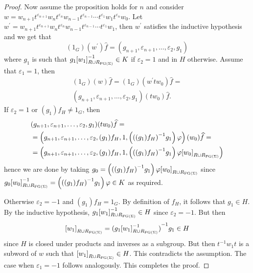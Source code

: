 \begin{proof}
  Now assume the proposition holds for $n$ and consider
  $w = w_{n+1} t^{\varepsilon_{n+1}} w_n t^{\varepsilon_n} w_{n-1} t^{\varepsilon_{n-1}} \cdots
  t^{\varepsilon_{1}}w_{1} t^{\varepsilon_n}w_0$.
  Let $w^\prime = w_{n+1} t^{\varepsilon_{n+1}} w_n t^{\varepsilon_n} w_{n-1}
  t^{\varepsilon_{n-1}} \cdots t^{\varepsilon_{1}}w_{1}$, then $w^\prime$ satisfies the inductive
  hypothesis and we get that
  \[(1_G)(w^\prime)\widehat{f} = (g_{n+1}, \varepsilon_{n+1}, \ldots, \varepsilon_2, g_1)\]
  where $g_1$ is such that $g_1 {[w_1]}_{R\cup R_{\textrm{FG}(\Sigma)}}^{-1}\in K$ if $\varepsilon_2 = 1$ and in $H$ otherwise.
  Assume that $\varepsilon_1 = 1$, then
  \begin{align*}
    (1_G)(w)\widehat{f} = (1_G)(w^\prime t w_0)\widehat{f} = \\
    (g_{n+1}, \varepsilon_{n+1}, \ldots, \varepsilon_2, g_1)(tw_0)\widehat{f}.
  \end{align*}
  If $\varepsilon_2 = 1$ or $(g_1)f_H \neq 1_G$, then
  \begin{align*}
    &(g_{n+1}, \varepsilon_{n+1}, \ldots, \varepsilon_2, g_1)(tw_0)\widehat{f} = \\
    &=\left(g_{n+1}, \varepsilon_{n+1}, \ldots, \varepsilon_2, (g_1)f_H, 1,
    \left({\left((g_1)f_H\right)}^{-1}g_1\right)\varphi\right)(w_0)\widehat{f} = \\
    &=\left(g_{n+1}, \varepsilon_{n+1}, \ldots, \varepsilon_2, (g_1)f_H, 1,
    \left({\left((g_1)f_H\right)}^{-1}g_1\right)\varphi {[w_0]}_{R\cup R_{\textrm{FG}(\Sigma)}}\right) \\
  \end{align*}
  hence we are done by taking
  $g_0 = \left({\left((g_1)f_H\right)}^{-1}g_1\right)\varphi {[w_0]}_{R\cup R_{\textrm{FG}(\Sigma)}}$ since
  $g_0 {[w_0]}^{-1}_{R\cup R_{\textrm{FG}(\Sigma)}} = \left({\left((g_1)f_H\right)}^{-1}g_1\right)\varphi \in K$ as required.

  Otherwise $\varepsilon_2 = -1$ and $(g_1)f_H = 1_G$. By definition of $f_H$, it follows that
  $g_1 \in H$. By the inductive hypothesis, $g_1{[w_1]}_{R\cup R_{\textrm{FG}(\Sigma)}}^{-1} \in H$ since
  $\varepsilon_2 = -1$. But then
  \[
    {[w_1]}_{R\cup R_{\textrm{FG}(\Sigma)}} = {(g_1{[w_1]}_{R\cup R_{\textrm{FG}(\Sigma)}}^{-1})}^{-1} g_1\in H
  \]
  since $H$ is closed under products and inverses as a subgroup.
  But then $t^{-1} w_1 t$ is a subword of $w$ such that ${[w_1]}_{R\cup R_{\textrm{FG}(\Sigma)}} \in H$.
  This contradicts the assumption.
  The case when $\varepsilon_1 = -1$ follows analogously. This completes the proof.
\end{proof}


